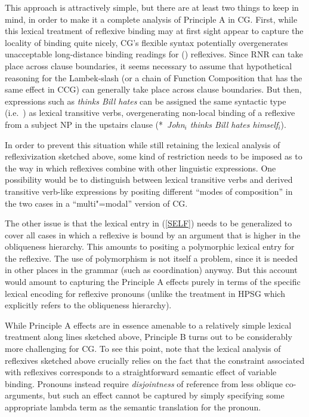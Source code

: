 \documentclass[output=paper
                ,modfonts
 	        ,biblatex
                ,babelshorthands
                ,newtxmath
                ,draftmode
                ,colorlinks, citecolor=brown
]{langscibook}
\begin{document}
\begin{exe}
 \ex\label{SELF}
        {}
        {}
\end{exe}

This approach is attractively simple, but there are at least two
things to keep in mind, in order to make it a complete analysis of
Principle A in CG. First, while this 
lexical treatment of reflexive binding may at first sight 
appear to capture the locality of binding quite nicely, CG's flexible
syntax potentially overgenerates unacceptable long-distance binding
readings for () reflexives. Since RNR can take
place across clause boundaries,  it seems necessary to
assume that hypothetical reasoning for the Lambek-slash
(or a chain of Function Composition that has the same effect in CCG)
can generally take place across clause boundaries. But then,
expressions such as \textit{thinks Bill hates} can be assigned
the same syntactic type (i.e.\  ) as lexical transitive verbs,
overgenerating non-local binding of a reflexive from a subject NP in
the upstairs clause (*~\textit{John\ensuremath{_i} thinks Bill hates {himself\ensuremath{_i}}}).

In order to prevent this situation while still retaining the lexical
analysis of reflexivization sketched above, some kind of restriction
needs to be imposed as to the way in which reflexives combine with
other linguistic expressions. One possibility would be to distinguish
between lexical transitive verbs and derived transitive verb-like
expressions by positing different ``modes of composition'' in the two
cases in a ``multi"=modal'' version of CG.

The other issue is that the lexical entry in (\ref{SELF}) needs to be
generalized to cover all cases in which a reflexive is bound by an
argument that is higher in the obliqueness hierarchy. This amounts to
positing a polymorphic lexical entry for the reflexive. The use of
polymorphism is not itself a problem, since it is needed in other
places in the grammar (such as coordination) anyway. But this account
would amount to capturing the Principle A effects purely in terms of the 
specific lexical encoding for reflexive pronouns (unlike the treatment
in HPSG which explicitly refers to the obliqueness hierarchy).

While Principle A effects are in essence amenable to a 
relatively simple lexical treatment along lines sketched above, Principle B turns out to be
considerably more challenging for CG. To see this point, note that the
lexical analysis of reflexives sketched above crucially relies on the
fact that the constraint associated with reflexives corresponds to a
straightforward semantic effect of variable binding. Pronouns instead
require \emph{disjointness} of reference from less oblique co-arguments, but
such an effect cannot be captured by simply specifying some
appropriate lambda term as the semantic translation for the pronoun.
\end{document}
